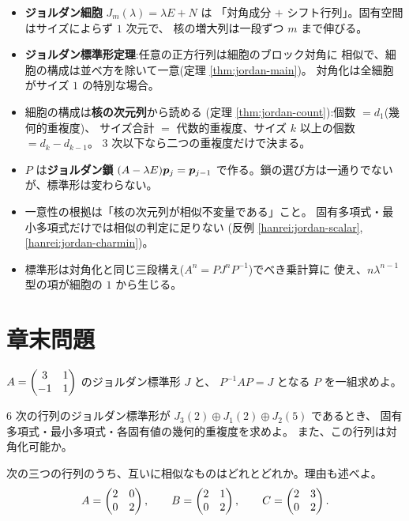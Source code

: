 \begin{matome}
\begin{itemize}
\item \textbf{ジョルダン細胞} $J_m(\lambda) = \lambda E + N$ は
「対角成分 $+$ シフト行列」。固有空間はサイズによらず $1$ 次元で、
核の増大列は一段ずつ $m$ まで伸びる。
\item \textbf{ジョルダン標準形定理}:任意の正方行列は細胞のブロック対角に
相似で、細胞の構成は並べ方を除いて一意(定理 \ref{thm:jordan-main})。
対角化は全細胞がサイズ $1$ の特別な場合。
\item 細胞の構成は\textbf{核の次元列}から読める
(定理 \ref{thm:jordan-count}):個数 $= d_1$(幾何的重複度)、
サイズ合計 $=$ 代数的重複度、サイズ $k$ 以上の個数 $= d_k - d_{k-1}$。
$3$ 次以下なら二つの重複度だけで決まる。
\item $P$ は\textbf{ジョルダン鎖} $(A - \lambda E)\bm{p}_j = \bm{p}_{j-1}$
で作る。鎖の選び方は一通りでないが、標準形は変わらない。
\item 一意性の根拠は「核の次元列が相似不変量である」こと。
固有多項式・最小多項式だけでは相似の判定に足りない
(反例 \ref{hanrei:jordan-scalar}, \ref{hanrei:jordan-charmin})。
\item 標準形は対角化と同じ三段構え($A^n = PJ^nP^{-1}$)でべき乗計算に
使え、$n\lambda^{n-1}$ 型の項が細胞の $1$ から生じる。
\end{itemize}
\end{matome}

\section*{章末問題}

\begin{mondai}[基本]\label{q:jordan-ex1}
$A = \begin{pmatrix}3 & 1 \\ -1 & 1\end{pmatrix}$ のジョルダン標準形 $J$ と、
$P^{-1}AP = J$ となる $P$ を一組求めよ。
\end{mondai}

\begin{mondai}[基本]\label{q:jordan-ex2}
$6$ 次の行列のジョルダン標準形が
$J_3(2) \oplus J_1(2) \oplus J_2(5)$ であるとき、
固有多項式・最小多項式・各固有値の幾何的重複度を求めよ。
また、この行列は対角化可能か。
\end{mondai}

\begin{mondai}[基本]\label{q:jordan-ex3}
次の三つの行列のうち、互いに相似なものはどれとどれか。理由も述べよ。
\[
A = \begin{pmatrix}2 & 0 \\ 0 & 2\end{pmatrix}, \qquad
B = \begin{pmatrix}2 & 1 \\ 0 & 2\end{pmatrix}, \qquad
C = \begin{pmatrix}2 & 3 \\ 0 & 2\end{pmatrix}.
\]
\end{mondai}

